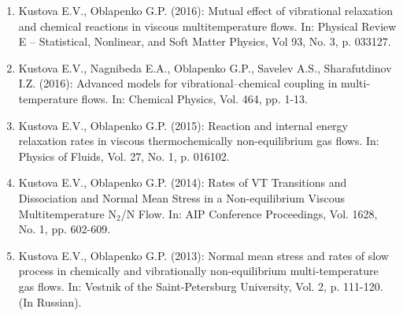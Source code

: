 \documentclass{resume} %
\begin{document}
\begin{enumerate}
\item {Kustova E.V., {Oblapenko G.P.}} (2016): Mutual effect of vibrational relaxation and chemical reactions in viscous multitemperature flows. In: Physical Review E -- Statistical, Nonlinear, and Soft Matter Physics, Vol 93, No. 3, p. 033127.

\item  {Kustova E.V., Nagnibeda E.A., {Oblapenko G.P.}, Savelev A.S., Sharafutdinov I.Z.} (2016): Advanced models for vibrational–chemical coupling in multi-temperature flows. In: Chemical Physics, Vol. 464, pp. 1-13.

\item {Kustova E.V., {Oblapenko G.P.}} (2015): Reaction and internal energy relaxation rates in viscous thermochemically non-equilibrium gas flows. In: Physics of Fluids, Vol. 27, No. 1, p. 016102.

\item  {Kustova E.V., {Oblapenko G.P.}} (2014): Rates of VT Transitions and Dissociation and Normal Mean Stress in a Non-equilibrium Viscous Multitemperature N$_2$/N Flow. In: AIP Conference Proceedings, Vol. 1628, No. 1, pp. 602-609.

\item  {Kustova E.V., {Oblapenko G.P.}} (2013):
{Normal mean stress and rates of slow process in chemically and vibrationally non-equilibrium multi-temperature gas flows.} In: Vestnik of the Saint-Petersburg University, Vol. 2, p. 111-120. (In Russian).
\end{enumerate}
\end{document}
